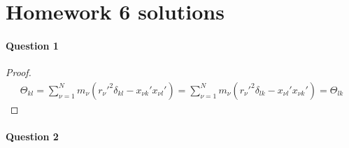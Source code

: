 \documentclass[11pt,a4paper]{article}
\author{Zehao Gao}
\begin{document}
\section*{Homework 6 solutions}

\paragraph{Question 1}

\begin{proof}

\begin{align}
\Theta_{kl}=\sum_{\nu=1}^N m_\nu(r_\nu'^2\delta_{kl}-x_{\nu k}'x_{\nu l}')=\sum_{\nu=1}^N m_\nu(r_\nu'^2\delta_{lk}-x_{\nu l}'x_{\nu k}')=\Theta_{lk}
\end{align}

\end{proof}

\paragraph{Question 2}
\end{document}
